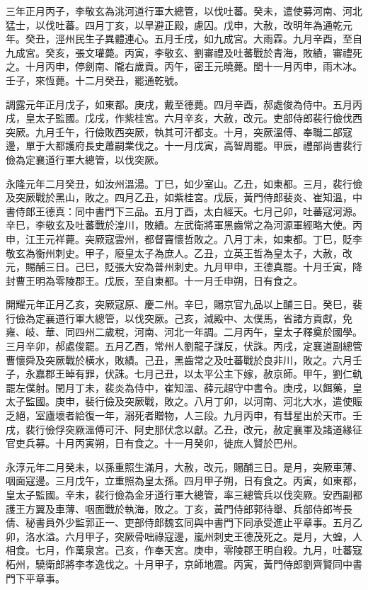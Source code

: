 \begin{pinyinscope}
 三年正月丙子，李敬玄為洮河道行軍大總管，以伐吐蕃。癸未，遣使募河南、河北猛士，以伐吐蕃。四月丁亥，以旱避正殿，慮囚。戊申，大赦，改明年為通乾元年。癸丑，涇州民生子異體連心。五月壬戌，如九成宮。大雨霖。九月辛酉，至自九成宮。癸亥，張文瓘薨。丙寅，李敬玄、劉審禮及吐蕃戰於青海，敗績，審禮死之。十月丙申，停劍南、隴右歲貢。丙午，密王元曉薨。閏十一月丙申，雨木冰。壬子，來恆薨。十二月癸丑，罷通乾號。



 調露元年正月戊子，如東都。庚戌，戴至德薨。四月辛酉，郝處俊為侍中。五月丙戌，皇太子監國。戊戌，作紫桂宮。六月辛亥，大赦，改元。吏部侍郎裴行儉伐西突厥。九月壬午，行儉敗西突厥，執其可汗都支。十月，突厥溫傅、奉職二部寇邊，單于大都護府長史蕭嗣業伐之。十一月戊寅，高智周罷。甲辰，禮部尚書裴行儉為定襄道行軍大總管，以伐突厥。



 永隆元年二月癸丑，如汝州溫湯。丁巳，如少室山。乙丑，如東都。三月，裴行儉及突厥戰於黑山，敗之。四月乙丑，如紫桂宮。戊辰，黃門侍郎裴炎、崔知溫，中書侍郎王德真：同中書門下三品。五月丁酉，太白經天。七月己卯，吐蕃寇河源。辛巳，李敬玄及吐蕃戰於湟川，敗績。左武衛將軍黑齒常之為河源軍經略大使。丙申，江王元祥薨。突厥寇雲州，都督竇懷哲敗之。八月丁未，如東都。丁巳，貶李敬玄為衡州刺史。甲子，廢皇太子為庶人。乙丑，立英王哲為皇太子，大赦，改元，賜酺三日。己巳，貶張大安為普州刺史。九月甲申，王德真罷。十月壬寅，降封曹王明為零陵郡王。戊辰，至自東都。十一月壬申朔，日有食之。



 開耀元年正月乙亥，突厥寇原、慶二州。辛巳，賜京官九品以上酺三日。癸巳，裴行儉為定襄道行軍大總管，以伐突厥。己亥，減殿中、太僕馬，省諸方貢獻，免雍、岐、華、同四州二歲稅，河南、河北一年調。二月丙午，皇太子釋奠於國學。三月辛卯，郝處俊罷。五月乙酉，常州人劉龍子謀反，伏誅。丙戌，定襄道副總管曹懷舜及突厥戰於橫水，敗績。己丑，黑齒常之及吐蕃戰於良非川，敗之。六月壬子，永嘉郡王晫有罪，伏誅。七月己丑，以太平公主下嫁，赦京師。甲午，劉仁軌罷左僕射。閏月丁未，裴炎為侍中，崔知溫、薛元超守中書令。庚戌，以餌藥，皇太子監國。庚申，裴行儉及突厥戰，敗之。八月丁卯，以河南、河北大水，遣使賑乏絕，室廬壞者給復一年，溺死者贈物，人三段。九月丙申，有彗星出於天市。壬戌，裴行儉俘突厥溫傅可汗、阿史那伏念以獻。乙丑，改元，赦定襄軍及諸道緣征官吏兵募。十月丙寅朔，日有食之。十一月癸卯，徙庶人賢於巴州。



 永淳元年二月癸未，以孫重照生滿月，大赦，改元，賜酺三日。是月，突厥車薄、咽面寇邊。三月戊午，立重照為皇太孫。四月甲子朔，日有食之。丙寅，如東都，皇太子監國。辛未，裴行儉為金牙道行軍大總管，率三總管兵以伐突厥。安西副都護王方翼及車薄、咽面戰於執海，敗之。丁亥，黃門侍郎郭待舉、兵部侍郎岑長倩、秘書員外少監郭正一、吏部侍郎魏玄同與中書門下同承受進止平章事。五月乙卯，洛水溢。六月甲子，突厥骨咄祿寇邊，嵐州刺史王德茂死之。是月，大蝗，人相食。七月，作萬泉宮。己亥，作奉天宮。庚申，零陵郡王明自殺。九月，吐蕃寇柘州，驍衛郎將李孝逸伐之。十月甲子，京師地震。丙寅，黃門侍郎劉齊賢同中書門下平章事。




\end{pinyinscope}
